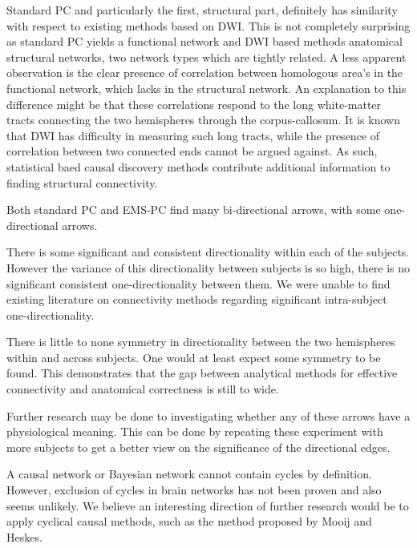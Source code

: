 \documentclass[a4paper, 10pt, english, onecolumn]{article}
\begin{document}
Standard PC and particularly the first, structural part, definitely has similarity with respect to existing methods based on DWI.
This is not completely surprising as standard PC yields a functional network and DWI based methods anatomical structural networks, two network types which are tightly related.
A less apparent observation is the clear presence of correlation between homologous area's in the functional network, which lacks in the structural network.
An explanation to this difference might be that these correlations respond to the long white-matter tracts connecting the two hemispheres through the corpus-callosum.
It is known that DWI has difficulty in measuring such long tracts, while the presence of correlation between two connected ends cannot be argued against.
As such, statistical baed causal discovery methods contribute additional information to finding structural connectivity.

Both standard PC and EMS-PC find many bi-directional arrows, with some one-directional arrows.

There is some significant and consistent directionality within each of the subjects.
However the variance of this directionality between subjects is so high, there is no significant consistent one-directionality between them.
We were unable to find existing literature on connectivity methods regarding significant intra-subject one-directionality.

There is little to none symmetry in directionality between the two hemispheres within and across subjects.
One would at least expect some symmetry to be found.
This demonstrates that the gap between analytical methods for effective connectivity and anatomical correctness is still to wide.

Further research may be done to investigating whether any of these arrows have a physiological meaning.
This can be done by repeating these experiment with more subjects to get a better view on the significance of the directional edges.

A causal network or Bayesian network cannot contain cycles by definition.
However, exclusion of cycles in brain networks has not been proven and also seems unlikely.
We believe an interesting direction of further research would be to apply cyclical causal methods, such as the method proposed by Mooij and Heskes\cite{Mooij20013}.
\end{document}
